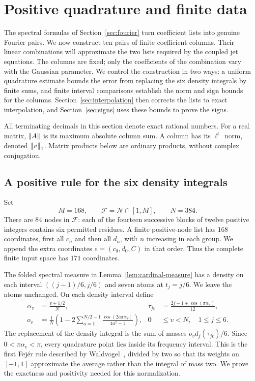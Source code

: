 \section{Positive quadrature and finite data}\label{sec:finite}

The spectral formulas of Section~\ref{sec:fourier} turn coefficient lists
into genuine Fourier pairs.  We now construct ten pairs of finite coefficient
columns.  Their linear
combinations will approximate the two lists required by the coupled jet
equations.  The columns are fixed; only the coefficients of the combination
vary with the Gaussian parameter.  We control the construction in two ways:
a uniform quadrature estimate bounds the error from replacing the six density
integrals by finite sums, and finite interval comparisons establish the norm
and sign bounds for the columns.  Section~\ref{sec:interpolation} then corrects
the lists to exact interpolation, and Section~\ref{sec:signs} uses these
bounds to prove the signs.

All terminating decimals in this section denote exact rational numbers.
For a real matrix, $\left\lVert A\right\rVert$ is its maximum absolute column sum.  A column
has its $\ell^1$ norm, denoted $\left\lVert v\right\rVert_1$.  Matrix products below are ordinary
products, without complex conjugation.

\subsection{A positive rule for the six density integrals}

Set
\[
 M=168,\qquad \mathcal F=\mathcal N\cap[1,M],\qquad N=384.
\]
There are $84$ nodes in $\mathcal F$: each of the fourteen successive
blocks of twelve positive integers contains six permitted residues.  A finite
positive-node list has $168$ coordinates, first all $c_n$ and then all $d_n$,
with $n$ increasing in each group.  We append the extra coordinates
$e=(c_0,d_0,C)$ in that order.  Thus the complete finite input space has
$171$ coordinates.

The folded spectral measure in Lemma~\ref{lem:cardinal-measure} has a density
on each interval $((j-1)/6,j/6)$ and seven atoms at $t_j=j/6$.  We leave the
atoms unchanged.  On each density interval define
\begin{equation}\label{eq:quadrature-rule}
\begin{aligned}
 \alpha_v&=\frac{v+1/2}{N},&
 \tau_{jv}&=\frac{2j-1+\cos(\pi\alpha_v)}{12},\\
 o_v&=\frac1N\left(1-2\sum_{a=1}^{N/2-1}
             \frac{\cos(2a\pi\alpha_v)}{4a^2-1}\right),
 &0&\le v<N,\quad 1\le j\le6.
\end{aligned}
\end{equation}
The replacement of the density integral is the sum of masses
$o_vd_j(\tau_{jv})/6$.  Since $0<\pi\alpha_v<\pi$, every quadrature
point lies inside its frequency interval.  This is the first Fej\'er rule
described by Waldvogel~\citep[Section~2]{Waldvogel2006}, divided by two so that its weights on
$[-1,1]$ approximate the average rather than the integral of mass two.
We prove the exactness and positivity needed for this normalization.

